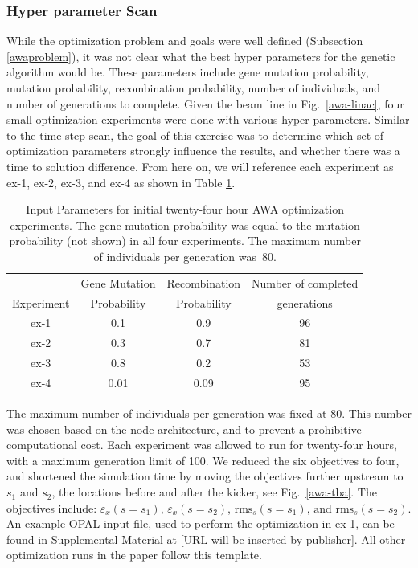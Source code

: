 \subsubsection{Hyper parameter Scan}
While the optimization problem and goals were well defined (Subsection \ref{awaproblem}), 
it was not clear what the best hyper parameters for the genetic algorithm would be.
These parameters include gene mutation probability, mutation probability, 
recombination probability, number of individuals, 
and number of generations to complete. 
Given the beam line in Fig.~\ref{awa-linac},
four small optimization experiments were done with various hyper parameters. 
Similar to the time step scan, 
the goal of this exercise was to determine which set of optimization
parameters strongly influence the results, 
and whether there was a time to solution difference.
From here on, we will reference each experiment as ex-1, ex-2, ex-3, and ex-4
as shown in Table \ref{extable}. 
\begin{table}%
\begin{center}
\caption{Input Parameters for initial twenty-four hour AWA optimization experiments. 
The gene mutation probability was equal to the mutation probability (not shown) in all four experiments. 
The maximum number of individuals per generation was~80.}
\vspace{1em}
\label{extable}
\begin{tabular}{c|c|c|c}
\cline{1-4}
& Gene Mutation \qquad& Recombination \qquad & Number of completed \vspace{-0.75em}\\
Experiment & Probability & Probability &  generations \\ 
\cline{1-4}
ex-1 &  0.1  & 0.9  &  96 \\
ex-2 &  0.3  & 0.7  &  81 \\
ex-3 &  0.8  & 0.2  &  53 \\
ex-4 &  0.01 & 0.09 &  95 \\ 
\cline{1-4}
\end{tabular}
\end{center}
\end{table}

The maximum number of individuals per generation was fixed at 80. 
This number was chosen based on the node architecture, and  
to prevent a prohibitive computational cost.  
Each experiment was allowed to run for twenty-four hours, with 
a maximum generation limit of 100. 
We reduced the six objectives to four, 
and shortened the simulation time by moving the objectives further 
upstream to $s_1$ and $s_2$, the locations before and after the kicker, 
see Fig.~\ref{awa-tba}.  
The objectives include: $\varepsilon_{x}\left(s = s_1\right)\text{, } \varepsilon_{x}\left(s = s_2\right)$, $\text{rms}_{s}\left(s = s_1\right)\text{, and }  \text{rms}_{s}\left(s = s_2\right)$. 
An example OPAL input file, used to perform the optimization in ex-1, 
can be found in Supplemental Material at [URL will be inserted by publisher].
All other optimization runs in the paper follow this template.

